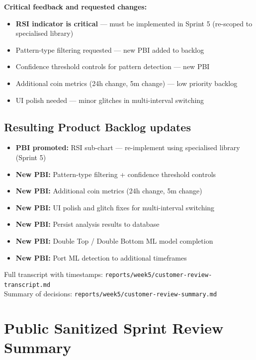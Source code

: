 \documentclass[11pt,a4paper]{article}
\begin{document}
\textbf{Critical feedback and requested changes:}
\begin{itemize}
    \item \textbf{RSI indicator is critical} --- must be implemented in Sprint 5 (re-scoped to specialised library)
    \item Pattern-type filtering requested --- new PBI added to backlog
    \item Confidence threshold controls for pattern detection --- new PBI
    \item Additional coin metrics (24h change, 5m change) --- low priority backlog
    \item UI polish needed --- minor glitches in multi-interval switching
\end{itemize}

\subsection{Resulting Product Backlog updates}
\begin{itemize}
    \item \textbf{PBI promoted:} RSI sub-chart --- re-implement using specialised library (Sprint 5)
    \item \textbf{New PBI:} Pattern-type filtering + confidence threshold controls
    \item \textbf{New PBI:} Additional coin metrics (24h change, 5m change)
    \item \textbf{New PBI:} UI polish and glitch fixes for multi-interval switching
    \item \textbf{New PBI:} Persist analysis results to database
    \item \textbf{New PBI:} Double Top / Double Bottom ML model completion
    \item \textbf{New PBI:} Port ML detection to additional timeframes
\end{itemize}

Full transcript with timestamps: \texttt{reports/week5/customer-review-transcript.md} \\
Summary of decisions: \texttt{reports/week5/customer-review-summary.md}

\section{Public Sanitized Sprint Review Summary}
\end{document}
